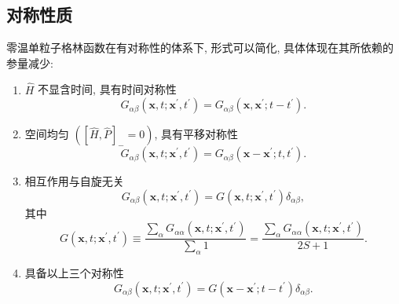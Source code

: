 \subsection{对称性质}
零温单粒子格林函数在有对称性的体系下, 形式可以简化, 具体体现在其所依赖的参量减少:
\begin{enumerate}
\item $\hat{H}$ 不显含时间, 具有时间对称性
\begin{equation}
G_{\alpha \beta}\left(\boldsymbol{x}, t ; \boldsymbol{x}^{\prime}, t^{\prime}\right)=G_{\alpha \beta}\left(\boldsymbol{x}, \boldsymbol{x}^{\prime} ; t-t^{\prime}\right) .
\end{equation}
\item 空间均匀 $([\hat{H}, \hat{P}]_-=0)$, 具有平移对称性
\begin{equation}
G_{\alpha \beta}\left(\boldsymbol{x}, t ; \boldsymbol{x}^{\prime}, t^{\prime}\right)=G_{\alpha \beta}\left(\boldsymbol{x}-\boldsymbol{x}^{\prime} ; t, t^{\prime}\right) .
\end{equation}
\item 相互作用与自旋无关
\begin{equation}
G_{\alpha \beta}\left(\boldsymbol{x}, t ; \boldsymbol{x}^{\prime}, t^{\prime}\right)=G\left(\boldsymbol{x}, t ; \boldsymbol{x}^{\prime}, t^{\prime}\right) \delta_{\alpha \beta} ,
\end{equation}
其中
\begin{equation}
G\left(\boldsymbol{x}, t ; \boldsymbol{x}^{\prime}, t^{\prime}\right)\equiv\frac{\displaystyle\sum_\alpha G_{\alpha \alpha}\left(\boldsymbol{x}, t ; \boldsymbol{x}^{\prime}, t^{\prime}\right)}{\displaystyle\sum_\alpha 1}=\frac{\displaystyle\sum_\alpha G_{\alpha \alpha}\left(\boldsymbol{x}, t ; \boldsymbol{x}^{\prime}, t^{\prime}\right)}{2S+1}.
\end{equation}
\item 具备以上三个对称性
\begin{equation}
G_{\alpha \beta}\left(\boldsymbol{x}, t ; \boldsymbol{x}^{\prime}, t^{\prime}\right)=G\left(\boldsymbol{x}-\boldsymbol{x}^{\prime} ; t-t^{\prime}\right)\delta_{\alpha \beta }.
\end{equation}
\end{enumerate}

